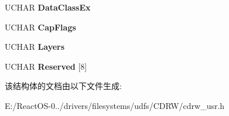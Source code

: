\begin{DoxyCompactItemize}
U\+C\+H\+AR {\bfseries Data\+Class\+Ex}
\item 
\mbox{\label{struct___g_e_t___m_e_d_i_a___t_y_p_e___e_x___u_s_e_r___o_u_t_a718f60e550dd112975525c1c2d2ec05e}} 
U\+C\+H\+AR {\bfseries Cap\+Flags}
\item 
\mbox{\label{struct___g_e_t___m_e_d_i_a___t_y_p_e___e_x___u_s_e_r___o_u_t_a3aff361f2ca15e7cf10f12c04e701af8}} 
U\+C\+H\+AR {\bfseries Layers}
\item 
\mbox{\label{struct___g_e_t___m_e_d_i_a___t_y_p_e___e_x___u_s_e_r___o_u_t_a2d6e3bc78a823a2b6cc85485e165f3e2}} 
U\+C\+H\+AR {\bfseries Reserved} \mbox{[}8\mbox{]}
\end{DoxyCompactItemize}


该结构体的文档由以下文件生成\+:\begin{DoxyCompactItemize}
\item 
E\+:/\+React\+O\+S-\/0../drivers/filesystems/udfs/\+C\+D\+R\+W/cdrw\+\_\+usr.\+h\end{DoxyCompactItemize}
